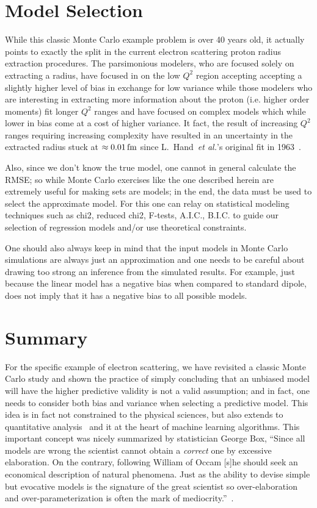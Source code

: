 \documentclass[10pt,aps,prc,twocolumn]{revtex4-1}
\begin{document}
\section{Model Selection}

While this classic Monte Carlo example problem is over 40 years old, it actually points to exactly the split in 
the current electron scattering proton radius extraction procedures.     The parsimonious modelers, who are 
focused solely on extracting a radius, have focused in on the low $Q^2$ region accepting accepting a slightly higher 
level of bias in exchange for low variance while those modelers who are interesting in extracting more information 
about the proton (i.e. higher order moments) fit longer $Q^2$ ranges and have
focused on complex models which while lower in bias come at a cost of higher variance.  
It fact, the result of increasing $Q^2$ ranges requiring increasing complexity have resulted in
an uncertainty in the extracted radius 
stuck at $\approx \unit[0.01]{fm}$ since L.~Hand~\textit{et al.}'s original fit in 1963~\cite{Hand:1963zz}.

Also, since we don't know the true model, one cannot in general calculate the RMSE; so while Monte Carlo exercises 
like the one described herein are extremely useful for making sets are models; in the end, the data must be used 
to select the approximate model. 
For this one can relay on statistical modeling techniques such as chi2, reduced chi2, F-tests, A.I.C., B.I.C. 
to guide our selection of regression models and/or use theoretical constraints.

One should also always keep in mind that the input models in Monte Carlo simulations are always just an approximation
and one needs to be careful about drawing too strong an inference from the simulated results. 
For example, just because the linear model has a negative bias when compared to standard dipole, does not imply that 
it has a negative bias to all possible models.


\section{Summary}

For the specific example of electron scattering, we have revisited a classic Monte Carlo study and shown
the practice of simply concluding that an unbiased model will have the higher predictive validity 
is not a valid assumption; and in fact, one needs to consider both bias and variance when selecting
a predictive model.   This idea is in fact not constrained to the physical sciences, but also extends 
to quantitative analysis~\cite{Brighton:2015} and it at the heart of machine learning algorithms.
This important concept was nicely summarized by statistician George Box, ``Since all models 
are wrong the scientist cannot obtain a {\it{correct}} one
by excessive elaboration.  On the contrary, following William of Occam [s]he should seek an
economical description of natural phenomena. Just as the ability to devise simple 
but evocative models is the signature of the
great scientist so over-elaboration and over-parameterization is often
the mark of mediocrity.''~\cite{Box76}.
\end{document}
